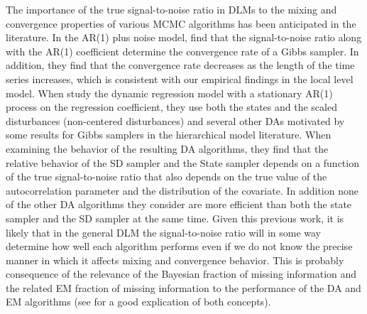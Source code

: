 \documentclass[12pt]{article}
\begin{document}
The importance of the true signal-to-noise ratio in DLMs to the mixing and convergence properties of various MCMC algorithms has been anticipated in the literature. In the AR(1) plus noise model, \citet{pitt1999analytic} find that the signal-to-noise ratio along with the AR(1) coefficient determine the convergence rate of a Gibbs sampler. In addition, they find that the convergence rate decreases as the length of the time series increases, which is consistent with our empirical findings in the local level model. When \citet{fruhwirth2004efficient} study the dynamic regression model with a stationary AR(1) process on the regression coefficient, they use both the states and the scaled disturbances (non-centered disturbances) and several other DAs motivated by some results for Gibbs samplers in the hierarchical model literature. When examining the behavior of the resulting DA algorithms, they find that the relative behavior of the SD sampler and the State sampler depends on a function of the true signal-to-noise ratio that also depends on the true value of the autocorrelation parameter and the distribution of the covariate. In addition none of the other DA algorithms they consider are more efficient than both the state sampler and the SD sampler at the same time. Given this previous work, it is likely that in the general DLM the signal-to-noise ratio will in some way determine how well each algorithm performs even if we do not know the precise manner in which it affects mixing and convergence behavior. This is probably consequence of the relevance of the Bayesian fraction of missing information and the related EM fraction of missing information to the performance of the DA and EM algorithms (see \citet{van2001art} for a good explication of both concepts).
\end{document}
